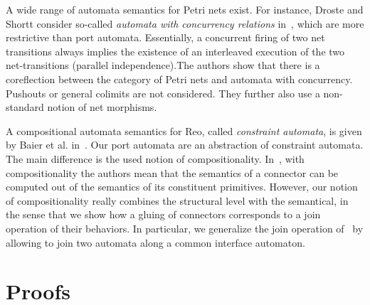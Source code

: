 \documentclass[copyright,creativecommons]{eptcs}
\begin{document}
A wide range of automata semantics for Petri nets exist. 
For instance, Droste 
and Shortt consider so-called \emph{automata
with concurrency relations} in~\cite{DS02}, which are more 
restrictive than port automata. Essentially, a concurrent 
firing of two net transitions always implies the existence 
of an interleaved execution of the two net-transitions 
(parallel independence).The authors show that there is a
coreflection between the category of Petri nets and automata 
with concurrency.
Pushouts or general colimits are not considered.
They further also use a non-standard notion of net morphisms.

A compositional automata semantics for Reo,
called \emph{constraint automata}, is
given by Baier et al. in~\cite{BSAR06}. 
Our port automata are an abstraction of 
constraint automata. The main difference
is the used notion of compositionality.
In~\cite{BSAR06}, with compositionality 
the authors mean that the semantics of a 
connector can be computed out of the semantics
of its constituent primitives. However, our
notion of compositionality really combines
the structural level with the semantical,
in the sense that we show how a gluing of
connectors corresponds to a join operation
of their behaviors. In particular, we generalize
the join operation of~\cite{BSAR06} by allowing
to join two automata along a common interface 
automaton.

\nocite{BCEH05}

 
 

\appendix

\section{Proofs}
\label{sec:proofs}
\end{document}
